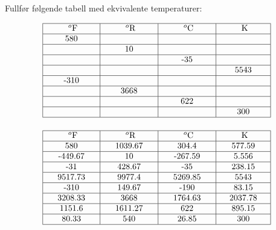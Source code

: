 

Fullfør følgende tabell med ekvivalente temperaturer:


$$\vbox{\offinterlineskip
\halign{\strut
\vrule \quad\hfil # \ \hfil &
\vrule \quad\hfil # \ \hfil &
\vrule \quad\hfil # \ \hfil &
\vrule \quad\hfil # \ \hfil \vrule \cr
\noalign{\hrule}
%
\hskip 20pt $^{o}$F \hskip 20pt & \hskip 20pt $^{o}$R \hskip 20pt & \hskip 20pt $^{o}$C \hskip 20pt & \hskip 20pt K \hskip 20pt \cr
%
\noalign{\hrule}
%
580 &  &  &  \cr
%
\noalign{\hrule}
%
  & 10 &  &  \cr
%
\noalign{\hrule}
%
  &  & -35 &  \cr
%
\noalign{\hrule}
%
  &  &  & 5543 \cr
%
\noalign{\hrule}
%
-310  &  &  &  \cr
%
\noalign{\hrule}
%
  & 3668 &  &  \cr
%
\noalign{\hrule}
%
  &  & 622 &  \cr
%
\noalign{\hrule}
%
  &  &  & 300 \cr
%
\noalign{\hrule}
} %
}$$ %








$$\vbox{\offinterlineskip
\halign{\strut
\vrule \quad\hfil # \ \hfil &
\vrule \quad\hfil # \ \hfil &
\vrule \quad\hfil # \ \hfil &
\vrule \quad\hfil # \ \hfil \vrule \cr
\noalign{\hrule}
%
\hskip 20pt $^{o}$F \hskip 20pt & \hskip 20pt $^{o}$R \hskip 20pt & \hskip 20pt $^{o}$C \hskip 20pt & \hskip 20pt K \hskip 20pt \cr
%
\noalign{\hrule}
%
580 & 1039.67 & 304.4 & 577.59 \cr
%
\noalign{\hrule}
%
-449.67  & 10 & -267.59 & 5.556 \cr
%
\noalign{\hrule}
%
-31 & 428.67 & -35 & 238.15 \cr
%
\noalign{\hrule}
%
9517.73 & 9977.4 & 5269.85 & 5543 \cr
%
\noalign{\hrule}
%
-310 & 149.67 & -190 & 83.15 \cr
%
\noalign{\hrule}
%
3208.33 & 3668 & 1764.63 & 2037.78 \cr
%
\noalign{\hrule}
%
1151.6 & 1611.27 & 622 & 895.15 \cr
%
\noalign{\hrule}
%
80.33 & 540 & 26.85 & 300 \cr
%
\noalign{\hrule}
} %
}$$ %









